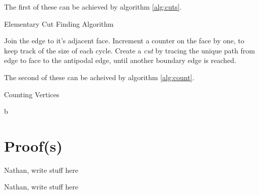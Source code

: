 \documentclass[11pt,a4paper]{article}
\begin{document}
The first of these can be achieved by algorithm \ref{alg:cuts}.

\begin{algorithm}
  \caption{Elementary Cut Finding Algorithm}\label{alg:cuts}
  \begin{algorithmic}[1]
      	\State Join the edge to it's adjacent face.
      	\State Increment a counter on the face by one, to keep track of the size of each cycle.
      \EndFor
      	\State Create a \emph{cut} by tracing the unique path from edge to face to the antipodal edge, until another boundary edge is reached.
      \EndFor
  \end{algorithmic}
\end{algorithm}

The second of these can be acheived by algorithm \ref{alg:count}.

\begin{algorithm}
	\caption{Counting Vertices}\label{alg:count}
	\begin{algorithmic}[1]
			\State b
		\EndFor
	\end{algorithmic}
\end{algorithm}

\section{Proof(s)} \label{sec:proof}

Nathan, write stuff here

Nathan, write stuff here

%
%
%
%
%
%
%

\end{document}

